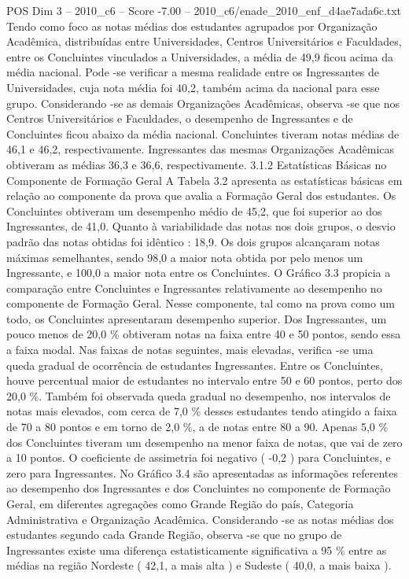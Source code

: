 \begin{textsample}{POS Dim 3 – 2010\_c6 – Score -7.00 – 2010\_c6/enade\_2010\_enf\_d4ae7ada6c.txt}
Tendo como foco as notas médias dos estudantes agrupados por Organização Acadêmica, distribuídas entre Universidades, Centros Universitários e Faculdades, entre os Concluintes vinculados a Universidades, a média de 49,9 ficou acima da média nacional.
Pode -se verificar a mesma realidade entre os Ingressantes de Universidades, cuja nota média foi 40,2, também acima da nacional para esse grupo.
Considerando -se as demais Organizações Acadêmicas, observa -se que nos Centros Universitários e Faculdades, o desempenho de Ingressantes e de Concluintes ficou abaixo da média nacional.
Concluintes tiveram notas médias de 46,1 e 46,2, respectivamente.
Ingressantes das mesmas Organizações Acadêmicas obtiveram as médias 36,3 e 36,6, respectivamente. 3.1.2 Estatísticas Básicas no Componente de Formação Geral A Tabela 3.2 apresenta as estatísticas básicas em relação ao componente da prova que avalia a Formação Geral dos estudantes.
Os Concluintes obtiveram um desempenho médio de 45,2, que foi superior ao dos Ingressantes, de 41,0.
Quanto à variabilidade das notas nos dois grupos, o desvio padrão das notas obtidas foi idêntico : 18,9.
Os dois grupos alcançaram notas máximas semelhantes, sendo 98,0 a maior nota obtida por pelo menos um Ingressante, e 100,0 a maior nota entre os Concluintes.
O Gráfico 3.3 propicia a comparação entre Concluintes e Ingressantes relativamente ao desempenho no componente de Formação Geral.
Nesse componente, tal como na prova como um todo, os Concluintes apresentaram desempenho superior.
Dos Ingressantes, um pouco menos de 20,0 \% obtiveram notas na faixa entre 40 e 50 pontos, sendo essa a faixa modal.
Nas faixas de notas seguintes, mais elevadas, verifica -se uma queda gradual de ocorrência de estudantes Ingressantes.
Entre os Concluintes, houve percentual maior de estudantes no intervalo entre 50 e 60 pontos, perto dos 20,0 \%.
Também foi observada queda gradual no desempenho, nos intervalos de notas mais elevados, com cerca de 7,0 \% desses estudantes tendo atingido a faixa de 70 a 80 pontos e em torno de 2,0 \%, a de notas entre 80 a 90.
Apenas 5,0 \% dos Concluintes tiveram um desempenho na menor faixa de notas, que vai de zero a 10 pontos.
O coeficiente de assimetria foi negativo ( -0,2 ) para Concluintes, e zero para Ingressantes.
No Gráfico 3.4 são apresentadas as informações referentes ao desempenho dos Ingressantes e dos Concluintes no componente de Formação Geral, em diferentes agregações como Grande Região do país, Categoria Administrativa e Organização Acadêmica.
Considerando -se as notas médias dos estudantes segundo cada Grande Região, observa -se que no grupo de Ingressantes existe uma diferença estatisticamente significativa a 95 \% entre as médias na região Nordeste ( 42,1, a mais alta ) e Sudeste ( 40,0, a mais baixa ).

\end{textsample}
